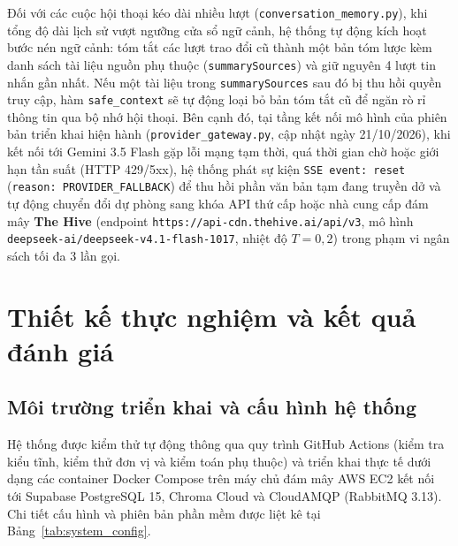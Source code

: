 \documentclass{IEEEtran}
\begin{document}
Đối với các cuộc hội thoại kéo dài nhiều lượt (\texttt{conversation\_memory.py}), khi tổng độ dài lịch sử vượt ngưỡng cửa sổ ngữ cảnh, hệ thống tự động kích hoạt bước nén ngữ cảnh: tóm tắt các lượt trao đổi cũ thành một bản tóm lược kèm danh sách tài liệu nguồn phụ thuộc (\texttt{summarySources}) và giữ nguyên 4 lượt tin nhắn gần nhất. Nếu một tài liệu trong \texttt{summarySources} sau đó bị thu hồi quyền truy cập, hàm \texttt{safe\_context} sẽ tự động loại bỏ bản tóm tắt cũ để ngăn rò rỉ thông tin qua bộ nhớ hội thoại. Bên cạnh đó, tại tầng kết nối mô hình của phiên bản triển khai hiện hành (\texttt{provider\_gateway.py}, cập nhật ngày 21/10/2026), khi kết nối tới Gemini 3.5 Flash gặp lỗi mạng tạm thời, quá thời gian chờ hoặc giới hạn tần suất (HTTP 429/5xx), hệ thống phát sự kiện \texttt{SSE event: reset} (\texttt{reason: PROVIDER\_FALLBACK}) để thu hồi phần văn bản tạm đang truyền dở và tự động chuyển đổi dự phòng sang khóa API thứ cấp hoặc nhà cung cấp đám mây \textbf{The Hive} (endpoint \texttt{https://api-cdn.thehive.ai/api/v3}, mô hình \texttt{deepseek-ai/deepseek-v4.1-flash-1017}, nhiệt độ $T = 0{,}2$) trong phạm vi ngân sách tối đa 3 lần gọi.

\section{Thiết kế thực nghiệm và kết quả đánh giá}
\label{sec:experiments_and_results}

\subsection{Môi trường triển khai và cấu hình hệ thống}
Hệ thống được kiểm thử tự động thông qua quy trình GitHub Actions (kiểm tra kiểu tĩnh, kiểm thử đơn vị và kiểm toán phụ thuộc) và triển khai thực tế dưới dạng các container Docker Compose trên máy chủ đám mây AWS EC2 kết nối tới Supabase PostgreSQL 15, Chroma Cloud và CloudAMQP (RabbitMQ 3.13). Chi tiết cấu hình và phiên bản phần mềm được liệt kê tại Bảng~\ref{tab:system_config}.
\end{document}
